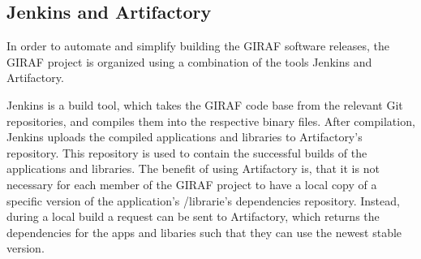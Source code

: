 \subsection{Jenkins and Artifactory}
In order to automate and simplify building the GIRAF software releases, the
GIRAF project is organized using a combination of the tools Jenkins and Artifactory.\nl

Jenkins is a build tool, which takes the GIRAF code base from the relevant Git
repositories, and compiles them into the respective binary files. After
compilation, Jenkins uploads the compiled applications and libraries to
Artifactory's repository. This repository is used to contain the
successful builds of the applications and libraries. The benefit of using
Artifactory is, that it is not necessary for each member of the GIRAF project
to have a local copy of a specific version of the application's /librarie's
dependencies repository. Instead, during a local build a request can be sent to
Artifactory, which returns the dependencies for the apps and libaries such that
they can use the newest stable version.

